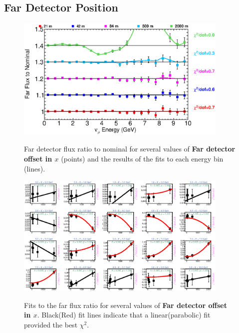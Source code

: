 \clearpage
\subsection{Far Detector Position}

\begin{figure}[ht]
  \begin{center}
    {\includegraphics[width=4.0in]{figures/LBNEFDX_far_summary.eps}}
  \end{center}
\caption{ Far detector flux ratio to nominal for several values of {\bf Far detector offset in $x$} (points) and the results of the fits to each energy bin (lines).}
\end{figure}

\begin{figure}[hb]
  \begin{center}
    {\includegraphics[width=4.0in]{figures/LBNEFDX_far_fits.eps}}
  \end{center}
\caption{ Fits to the far flux ratio for several values of {\bf Far detector offset in $x$}. Black(Red) fit lines indicate that a linear(parabolic) fit provided the best $\chi^2$. }
\end{figure}

